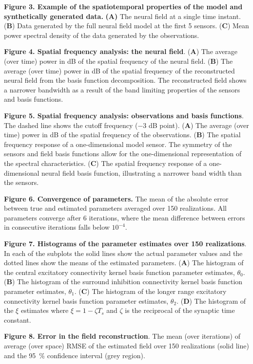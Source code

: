 \documentclass[review,authoryear,3p]{elsarticle}
\begin{document}
{\bf Figure 3. Example of the spatiotemporal properties of the model and synthetically generated data.} \textbf{(A)} The neural field at a single time instant. (\textbf{B}) Data generated by the full neural field model at the first 5 sensors. (\textbf{C}) Mean power spectral density of the data generated by the observations.

{\bf Figure 4. Spatial frequency analysis: the neural field}. (\textbf{A}) The average (over time) power in dB of the spatial frequency of the neural field. (\textbf{B}) The average (over time) power in dB of the spatial frequency of the reconstructed neural field from the basis function decomposition. The reconstructed field shows a narrower bandwidth as a result of the band limiting properties of the sensors and basis functions.

{\bf Figure 5. Spatial frequency analysis: observations and basis functions}. The dashed line shows the cutoff frequency ($-3$ dB point). (\textbf{A}) The average (over time) power in dB of the spatial frequency of the observations. (\textbf{B}) The spatial frequency response of a one-dimensional model sensor. The symmetry of the sensors and field basis functions allow for the one-dimensional representation of the spectral characteristics. (\textbf{C}) The spatial frequency response of a one-dimensional neural field basis function, illustrating a narrower band width than the sensors.

{\bf Figure 6. Convergence of parameters.} The mean of the absolute error between true and estimated parameters averaged over 150 realizations. All parameters converge after 6 iterations, where the mean difference between errors in consecutive iterations falls below $10^{-4}$.

{\bf Figure 7. Histograms of the parameter estimates over 150 realizations}. In  each of the subplots the solid lines show the actual parameter values and the dotted lines show the means of the estimated parameters. (\textbf{A}) The histogram of the central excitatory connectivity kernel basis function parameter estimates, $\theta_0$. (\textbf{B}) The histogram of the surround inhibition connectivity kernel basis function parameter estimates, $\theta_1$. (\textbf{C}) The histogram of the longer range excitatory connectivity kernel basis function parameter estimates, $\theta_2$. (\textbf{D}) The histogram of the $\xi$ estimates where $\xi=1-\zeta T_s $ and $\zeta$ is the reciprocal of the synaptic time constant.

{\bf Figure 8. Error in the field reconstruction}. The mean (over iterations) of average (over space) RMSE of the estimated field over 150 realizations (solid line) and the 95~\% confidence interval (grey region).
\end{document}
